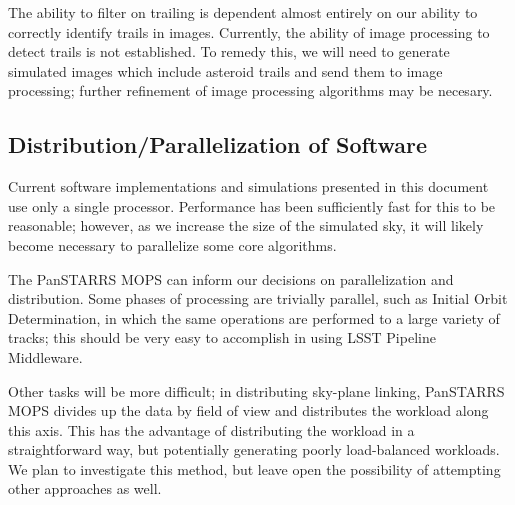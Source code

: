 \documentclass[12pt,preprint]{aastex}
\begin{document}
The ability to filter on trailing is dependent almost entirely on our
ability to correctly identify trails in images.  Currently, the
ability of image processing to detect trails is not established.  To
remedy this, we will need to generate simulated images which include
asteroid trails and send them to image processing; further refinement
of image processing algorithms may be necesary.



\subsection{Distribution/Parallelization of Software}

Current software implementations and simulations presented in this
document use only a single processor.  Performance has been
sufficiently fast for this to be reasonable; however, as we increase
the size of the simulated sky, it will likely become necessary to
parallelize some core algorithms.

The PanSTARRS MOPS can inform our decisions on parallelization and
distribution.  Some phases of processing are trivially parallel, such
as Initial Orbit Determination, in which the same operations are
performed to a large variety of tracks; this should be very easy to
accomplish in using LSST Pipeline Middleware.  

Other tasks will be more difficult; in distributing sky-plane linking,
PanSTARRS MOPS divides up the data by field of view and distributes
the workload along this axis.  This has the advantage of distributing
the workload in a straightforward way, but potentially generating
poorly load-balanced workloads.  We plan to investigate this method,
but leave open the possibility of attempting other approaches as well.




\end{document}
